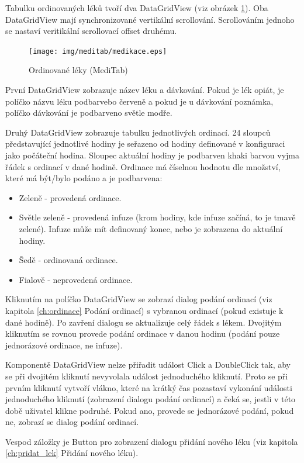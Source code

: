 Tabulku ordinovaných léků tvoří dva DataGridView (viz obrázek \ref{fig:medikace}). Oba DataGridView mají synchronizované vertikální scrollování. Scrollováním jednoho se nastaví veritikální scrollovací offset druhému.

\begin{figure}[H]
	\centering
	\texttt{[image: img/meditab/medikace.eps]}
	\caption{Ordinované léky (MediTab)}
  \label{fig:medikace}
\end{figure}

První DataGridView zobrazuje název léku a dávkování. Pokud je lék opiát, je políčko názvu léku podbarvebo červeně a pokud je u dávkování poznámka, políčko dávkování je podbarveno světle modře.

Druhý DataGridView zobrazuje tabulku jednotlivých ordinací. 24 sloupců představující jednotlivé hodiny je seřazeno od hodiny definované v konfiguraci jako počáteční hodina. Sloupec aktuální hodiny je podbarven khaki barvou vyjma řádek s ordinací v dané hodině. Ordinace má číselnou hodnotu dle množství, které má být/bylo podáno a je podbarvena:

\begin{itemize}
	\item Zeleně - provedená ordinace.
	\item Světle zeleně - provedená infuze (krom hodiny, kde infuze začíná, to je tmavě zelené). Infuze může mít definovaný konec, nebo je zobrazena do aktuální hodiny.
	\item Šedě - ordinovaná ordinace.
	\item Fialově - neprovedená ordinace.
\end{itemize}

Kliknutím na políčko DataGridView se zobrazí dialog podání ordinací (viz kapitola \ref{ch:ordinace} Podání ordinací) s vybranou ordinací (pokud existuje k dané hodině). Po zavření dialogu se aktualizuje celý řádek s lékem. Dvojitým kliknutím se rovnou provede podání ordinace v danou hodinu (podání pouze jednorázové ordinace, ne infuze).

Komponentě DataGridView nelze přiřadit událost Click a DoubleClick tak, aby se při dvojitém kliknutí nevyvolala událost jednoduchého kliknutí. Proto se při prvním kliknutí vytvoří vlákno, které na krátký čas pozastaví vykonání události jednoduchého kliknutí (zobrazení dialogu podání ordinací) a čeká se, jestli v této době uživatel klikne podruhé. Pokud ano, provede se jednorázové podání, pokud ne, zobrazí se dialog podání ordinací.

Vespod záložky je Button pro zobrazení dialogu přidání nového léku (viz kapitola \ref{ch:pridat_lek} Přidání nového léku).


